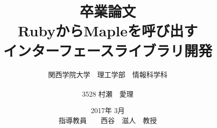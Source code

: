 \documentclass[12pt,a4paper]{jsarticle}
\begin{document}
\title{卒業論文\\ 
\vspace{4cm} RubyからMapleを呼び出す\\インターフェースライブラリ開発}
\author{ 関西学院大学　理工学部　情報科学科\\\\ 3528    村瀬　愛理}
\date{\vspace{3cm} 2017年  3月\\
\vspace{3cm} 指導教員　　西谷　滋人　教授}
\maketitle
\setcounter{tocdepth}{4}
\tableofcontents









\end{document}
